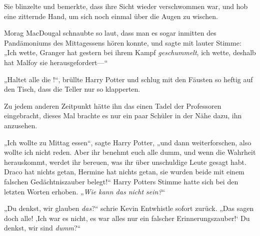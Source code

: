 Sie blinzelte und bemerkte, dass ihre Sicht wieder verschwommen war, und hob eine zitternde Hand, um sich noch einmal über die Augen zu wischen.

Morag MacDougal schnaubte so laut, dass man es sogar inmitten des Pandämoniums des Mittagessens hören konnte, und sagte mit lauter Stimme: „Ich wette, Granger hat gestern bei ihrem Kampf \emph{geschummelt}, ich wette, deshalb hat Malfoy sie herausgefordert—“

„Haltet alle die !“, brüllte Harry Potter und schlug mit den Fäusten so heftig auf den Tisch, dass die Teller nur so klapperten.

Zu jedem anderen Zeitpunkt hätte ihn das einen Tadel der Professoren eingebracht, dieses Mal brachte es nur ein paar Schüler in der Nähe dazu, ihn anzusehen.

„Ich wollte zu Mittag essen“, sagte Harry Potter, „und dann weiterforschen, also wollte ich nicht reden. Aber ihr benehmt euch alle dumm, und wenn die Wahrheit herauskommt, werdet ihr bereuen, was ihr über unschuldige Leute gesagt habt. Draco hat nichts getan, Hermine hat nichts getan, sie wurden beide mit einem falschen Gedächtniszauber belegt!“ Harry Potters Stimme hatte sich bei den letzten Worten erhoben. „\emph{Wie kann das nicht  sein?}“

„Du denkst, wir glauben \emph{das}?“ schrie Kevin Entwhistle sofort zurück. „Das sagen doch alle! ‚Ich war es nicht, es war alles nur ein falscher Erinnerungszauber!‘ Du denkst, wir sind \emph{dumm}?“

